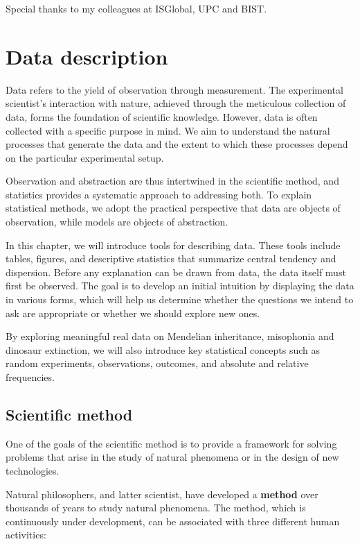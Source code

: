\documentclass[
]{book}
\begin{document}
Special thanks to my colleagues at ISGlobal, UPC and BIST.

\hypertarget{data-description}{%
\chapter{Data description}\label{data-description}}

Data refers to the yield of observation through measurement. The experimental scientist's interaction with nature, achieved through the meticulous collection of data, forms the foundation of scientific knowledge. However, data is often collected with a specific purpose in mind. We aim to understand the natural processes that generate the data and the extent to which these processes depend on the particular experimental setup.

Observation and abstraction are thus intertwined in the scientific method, and statistics provides a systematic approach to addressing both. To explain statistical methods, we adopt the practical perspective that data are objects of observation, while models are objects of abstraction.

In this chapter, we will introduce tools for describing data. These tools include tables, figures, and descriptive statistics that summarize central tendency and dispersion. Before any explanation can be drawn from data, the data itself must first be observed. The goal is to develop an initial intuition by displaying the data in various forms, which will help us determine whether the questions we intend to ask are appropriate or whether we should explore new ones.

By exploring meaningful real data on Mendelian inheritance, misophonia and dinosaur extinction, we will also introduce key statistical concepts such as random experiments, observations, outcomes, and absolute and relative frequencies.

\hypertarget{scientific-method}{%
\section{Scientific method}\label{scientific-method}}

One of the goals of the scientific method is to provide a framework for solving problems that arise in the study of natural phenomena or in the design of new technologies.

Natural philosophers, and latter scientist, have developed a \textbf{method} over thousands of years to study natural phenomena. The method, which is continuously under development, can be associated with three different human activities:
\end{document}
